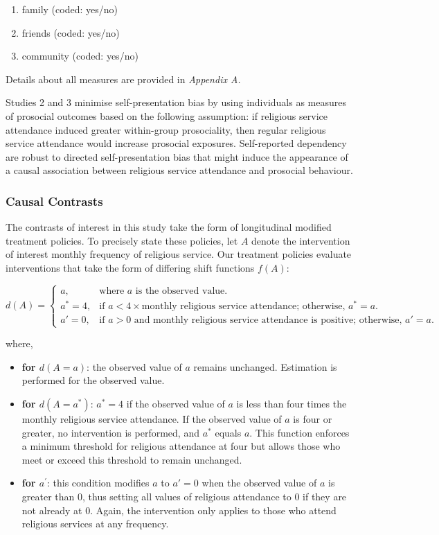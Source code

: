 \documentclass[
  single column]{article}
\providecommand{\tightlist}{%
  \setlength{\itemsep}{0pt}\setlength{\parskip}{0pt}}\usepackage{longtable,booktabs,array}
\begin{document}
\begin{enumerate}
\def\labelenumi{(\alph{enumi})}
\tightlist
\item
  family (coded: yes/no)
\item
  friends (coded: yes/no)
\item
  community (coded: yes/no)
\end{enumerate}

Details about all measures are provided in \emph{Appendix A.}

Studies 2 and 3 minimise self-presentation bias by using individuals as
measures of prosocial outcomes based on the following assumption: if
religious service attendance induced greater within-group prosociality,
then regular religious service attendance would increase prosocial
exposures. Self-reported dependency are robust to directed
self-presentation bias that might induce the appearance of a causal
association between religious service attendance and prosocial
behaviour.

\subsubsection{Causal Contrasts}\label{causal-contrasts}

The contrasts of interest in this study take the form of longitudinal
modified treatment policies. To precisely state these policies, let
\(A\) denote the intervention of interest monthly frequency of religious
service. Our treatment policies evaluate interventions that take the
form of differing shift functions \(f(A)\):

\[
d(A) = 
\begin{cases} 
a, & \text{where } a \text{ is the observed value.}\\
a^* = 4, & \text{if } a < 4 \times \text{monthly religious service attendance; otherwise, } a^* = a.\\
a' = 0, & \text{if } a > 0 \text{ and monthly religious service attendance is positive; otherwise, } a' = a. 
\end{cases}
\]

where,

\begin{itemize}
\item
  \textbf{for \(d(A=a)\)}: the observed value of \(a\) remains
  unchanged. Estimation is performed for the observed value.
\item
  \textbf{for \(d(A =a^*)\)}: \(a^* = 4\) if the observed value of \(a\)
  is less than four times the monthly religious service attendance. If
  the observed value of \(a\) is four or greater, no intervention is
  performed, and \(a^*\) equals \(a\). This function enforces a minimum
  threshold for religious attendance at four but allows those who meet
  or exceed this threshold to remain unchanged.
\item
  \textbf{for \(a^\prime\)}: this condition modifies \(a\) to \(a' = 0\)
  when the observed value of \(a\) is greater than 0, thus setting all
  values of religious attendance to 0 if they are not already at 0.
  Again, the intervention only applies to those who attend religious
  services at any frequency.
\end{itemize}
\end{document}
